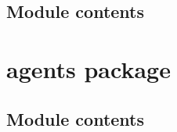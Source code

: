 \documentclass[letterpaper,10pt,english]{sphinxmanual}
\begin{document}
\subsection{Module contents}
\label{\detokenize{scripts:module-contents}}\label{\detokenize{scripts:module-scripts}}

\section{agents package}
\label{\detokenize{agents:agents-package}}\label{\detokenize{agents::doc}}

\subsection{Module contents}
\label{\detokenize{agents:module-contents}}\label{\detokenize{agents:module-agents}}
\end{document}
